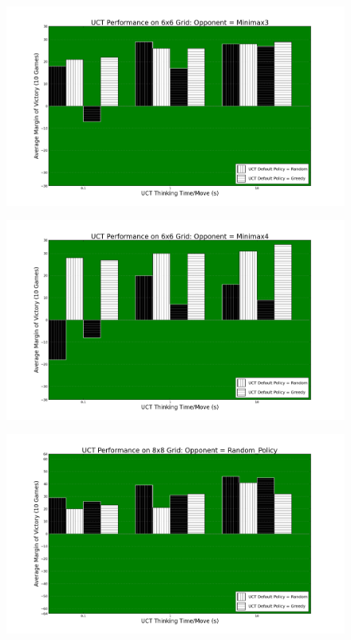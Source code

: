 \documentclass[12pt,letterpaper]{article}
\begin{document}
\begin{figure}[!hp]
\begin{center}
\includegraphics[scale=.4]{66_Minimax3}
\end{center}
\end{figure}

\begin{figure}[!h]
\begin{center}
\includegraphics[scale=.4]{66_Minimax4}
\end{center}
\end{figure}

\pagebreak

\begin{figure}[!hp]
\begin{center}
\includegraphics[scale=.4]{88_Random_Policy}
\end{center}
\end{figure}
\end{document}
